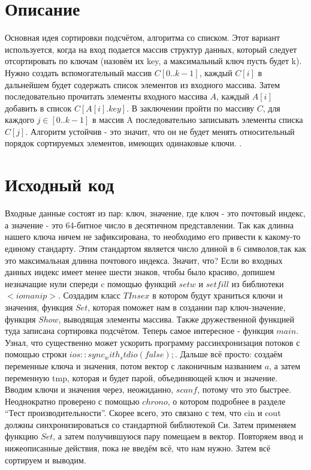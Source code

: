 \documentclass{article}
\begin{document}
\section{Описание}

Основная идея сортировки подсчётом, алгоритма со списком. Этот вариант используется, когда на вход подается массив структур данных, который следует отсортировать по ключам (назовём их key, а максимальный ключ пусть будет k). Нужно создать вспомогательный массив $C[0..k - 1]$, каждый $C[i]$ в дальнейшем будет содержать список элементов из входного массива. Затем последовательно прочитать элементы входного массива $A$, каждый $A[i]$ добавить в список $C[A[i].key]$. В заключении пройти по массиву $C$, для каждого $j \in [0..k - 1]$ в массив A последовательно записывать элементы списка $C[j]$. Алгоритм устойчив - это значит, что он не будет менять относительный порядок сортируемых элементов, имеющих одинаковые ключи. .

\pagebreak

\section{Исходный код}
Входные данные состоят из пар: ключ, значение, где ключ - это почтовый индекс, а значение - это 64-битное число в десятичном представлении. Так как длинна нашего ключа ничем не зафиксирована, то необходимо его привести к какому-то единому стандарту. Этим стандартом является число длиной в 6 символов,так как это максимальная длинна почтового индекса. Значит, что? Если во входных данных индекс имеет менее шести знаков, чтобы было красиво, допишем незначащие нули спереди c помощью функций $setw$ и $setfill$ из библиотеки $<iomanip>$. Создадим класс $TInsex$ в котором будут храниться ключи и значения, функция $Set$, которая поможет нам в создании пар ключ-значение, функция $Show$, выводящая элементы массива. Также дружественной функцией туда записана сортировка подсчётом.
Теперь самое интересное - функция $main$. Узнал, что существенно может ускорить программу рассинхронизация потоков с помощью строки $ios::sync_with_stdio(false);$. Дальше всё просто: создаём переменные ключа и значения, потом вектор с лаконичным названием $a$, а затем переменную tmp, которая и будет парой, объединяющей ключ и значение. Вводим ключи и значения через, неожиданно, $scanf$, потому что это быстрее. Неоднократно проверено с помощью $chrono$, о котором подробнее в разделе \enquote{Тест производительности}. Скорее всего, это связано с тем, что cin и cout должны синхронизироваться со стандартной библиотекой Си. Затем применяем функцию $Set$, а затем получившуюся пару помещаем в вектор. Повторяем ввод и нижеописанные действия, пока не введём всё, что нам нужно. Затем всё сортируем и выводим.
\end{document}
